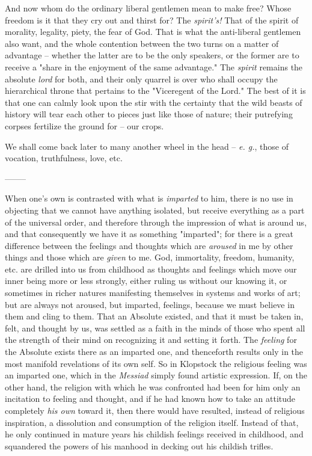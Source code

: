 And now whom do the ordinary liberal gentlemen mean to make free? Whose 
freedom is it that they cry out and thirst for? The \textit{spirit's!} That of 
the spirit of morality, legality, piety, the fear of God. That is what the 
anti-liberal gentlemen also want, and the whole contention between the two 
turns on a matter of advantage -- whether the latter are to be the only 
speakers, or the former are to receive a "{}share in the enjoyment of the same 
advantage."{} The \textit{spirit} remains the absolute \textit{lord} for both, 
and their only quarrel is over who shall occupy the hierarchical throne that 
pertains to the "{}Viceregent of the Lord."{} The best of it is that one can 
calmly look upon the stir with the certainty that the wild beasts of history 
will tear each other to pieces just like those of nature; their putrefying 
corpses fertilize the ground for -- our crops.

We shall come back later to many another wheel in the head -- \textit{e. g.}, 
those of vocation, truthfulness, love, etc.

\begin{center}
--------\end{center}


When one's own is contrasted with what is \textit{imparted} to him, there is 
no use in objecting that we cannot have anything isolated, but receive 
everything as a part of the universal order, and therefore through the 
impression of what is around us, and that consequently we have it as something 
"{}imparted"{}; for there is a great difference between the feelings and 
thoughts which are \textit{aroused} in me by other things and those which are 
\textit{given} to me. God, immortality, freedom, humanity, etc. are drilled 
into us from childhood as thoughts and feelings which move our inner being 
more or less strongly, either ruling us without our knowing it, or sometimes 
in richer natures manifesting themselves in systems and works of art; but are 
always not aroused, but imparted, feelings, because we must believe in them 
and cling to them. That an Absolute existed, and that it must be taken in, 
felt, and thought by us, was settled as a faith in the minds of those who 
spent all the strength of their mind on recognizing it and setting it forth. 
The \textit{feeling} for the Absolute exists there as an imparted one, and 
thenceforth results only in the most manifold revelations of its own self. So 
in Klopstock the religious feeling was an imparted one, which in the 
\textit{Messiad} simply found artistic expression. If, on the other hand, the 
religion with which he was confronted had been for him only an incitation to 
feeling and thought, and if he had known how to take an attitude completely 
\textit{his own} toward it, then there would have resulted, instead of 
religious inspiration, a dissolution and consumption of the religion itself. 
Instead of that, he only continued in mature years his childish feelings 
received in childhood, and squandered the powers of his manhood in decking out 
his childish trifles.

